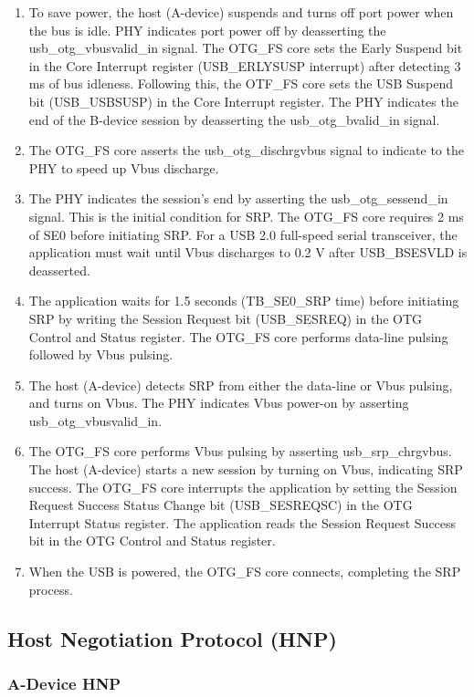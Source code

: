 \documentclass[main\_\_EN.tex]{subfiles}
\begin{document}
\begin{enumerate}
    \item To save power, the host (A-device) suspends and turns off port power when the bus is idle. PHY indicates port power off by deasserting the usb\_otg\_vbusvalid\_in signal. The OTG\_FS core sets the Early Suspend bit in the Core Interrupt register (USB\_ERLYSUSP interrupt) after detecting 3 ms of bus idleness. Following this, the OTF\_FS core sets the USB Suspend bit (USB\_USBSUSP) in the Core Interrupt register. The PHY indicates the end of the B-device session by deasserting the usb\_otg\_bvalid\_in signal.
    \item The OTG\_FS core asserts the usb\_otg\_dischrgvbus signal to indicate to the PHY to speed up Vbus discharge.
    \item The PHY indicates the session’s end by asserting the usb\_otg\_sessend\_in signal. This is the initial condition for SRP. The OTG\_FS core requires 2 ms of SE0 before initiating SRP. For a USB 2.0 full-speed serial transceiver, the application must wait until Vbus discharges to 0.2 V after USB\_BSESVLD is deasserted.
    \item The application waits for 1.5 seconds (TB\_SE0\_SRP time) before initiating SRP by writing the Session Request bit (USB\_SESREQ) in the OTG Control and Status register. The OTG\_FS core performs data-line pulsing followed by Vbus pulsing.
    \item The host (A-device) detects SRP from either the data-line or Vbus pulsing, and turns on Vbus. The PHY indicates Vbus power-on by asserting usb\_otg\_vbusvalid\_in.
    \item The OTG\_FS core performs Vbus pulsing by asserting usb\_srp\_chrgvbus. The host (A-device) starts a new session by turning on Vbus, indicating SRP success. The OTG\_FS core interrupts the application by setting the Session Request Success Status Change bit (USB\_SESREQSC) in the OTG Interrupt Status register. The application reads the Session Request Success bit in the OTG Control and Status register.
    \item When the USB is powered, the OTG\_FS core connects, completing the SRP process.
\end{enumerate}

\subsection{Host Negotiation Protocol (HNP)}

\subsubsection{A-Device HNP}
\end{document}
